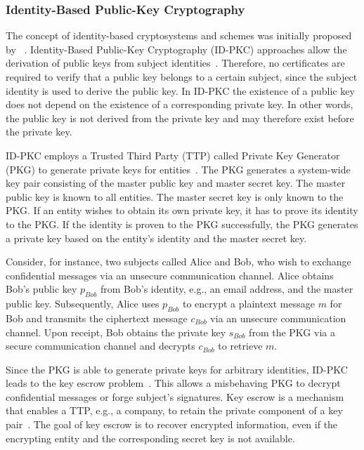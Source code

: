 \subsubsection{Identity-Based Public-Key Cryptography}
The concept of identity-based cryptosystems and schemes was initially proposed by \citeauthor{Shamir1985}~\cite{Shamir1985}.
Identity-Based Public-Key Cryptography (ID-PKC) approaches allow the derivation of public keys from subject identities~\cite{Shamir1985,Boneh2023}.
Therefore, no certificates are required to verify that a public key belongs to a certain subject, since the subject identity is used to derive the public key.
In ID-PKC the existence of a public key does not depend on the existence of a corresponding private key.
In other words, the public key is not derived from the private key and may therefore exist before the private key.

ID-PKC employs a Trusted Third Party (TTP) called Private Key Generator (PKG) to generate private keys for entities~\cite{AlRiyami2003,Boneh2023}.
The PKG generates a system-wide key pair consisting of the master public key and master secret key.
The master public key is known to all entities.
The master secret key is only known to the PKG.
If an entity wishes to obtain its own private key, it has to prove its identity to the PKG.
If the identity is proven to the PKG successfully, the PKG generates a private key based on the entity's identity and the master secret key.

Consider, for instance, two subjects called Alice and Bob, who wish to exchange confidential messages via an unsecure communication channel.
Alice obtains Bob's public key $p_{Bob}$ from Bob's identity, e.g., an email address, and the master public key.
Subsequently, Alice uses $p_{Bob}$ to encrypt a plaintext message $m$ for Bob and transmits the ciphertext message $c_{Bob}$ via an unsecure communication channel.
Upon receipt, Bob obtains the private key $s_{Bob}$ from the PKG via a secure communication channel and decrypts $c_{Bob}$ to retrieve $m$.

Since the PKG is able to generate private keys for arbitrary identities, ID-PKC leads to the key escrow problem~\cite{AlRiyami2003}.
This allows a misbehaving PKG to decrypt confidential messages or forge subject's signatures.
Key escrow is a mechanism that enables a TTP, e.g., a company, to retain the private component of a key pair~\cite{CNSS2021,Boneh2023}.
The goal of key escrow is to recover encrypted information, even if the encrypting entity and the corresponding secret key is not available.

